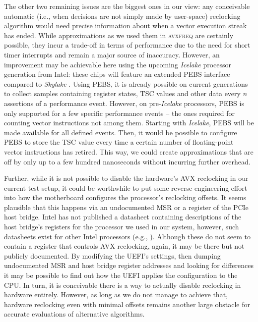 The other two remaining issues are the biggest ones in our view: any conceivable automatic (i.e., when decisions are not simply made by user-space) reclocking algorithm would need precise information about when a vector execution streak has ended. While approximations as we used them in \textsc{avxfreq} are certainly possible, they incur a trade-off in terms of performance due to the need for short timer interrupts and remain a major source of inaccuracy. However, an improvement may be achievable here using the upcoming \textit{Icelake} processor generation from Intel: these chips will feature an extended \gls{PEBS} interface compared to \textit{Skylake} \cite{intelsdmsysprogguide}. Using \gls{PEBS}, it is already possible on current generations to collect samples containing register states, \gls{TSC} values and other data every $n$ assertions of a performance event. However, on pre-\textit{Icelake} processors, \gls{PEBS} is only supported for a few specific performance events -- the ones required for counting vector instructions not among them. Starting with \textit{Icelake}, \gls{PEBS} will be made available for all defined events. Then, it would be possible to configure \gls{PEBS} to store the \gls{TSC} value every time a certain number of floating-point vector instructions has retired. This way, we could create approximations that are off by only up to a few hundred nanoseconds without incurring further overhead. 

Further, while it is not possible to disable the hardware's \gls{AVX} reclocking in our current test setup, it could be worthwhile to put some reverse engineering effort into how the motherboard configures the processor's reclocking offsets. It seems plausible that this happens via an undocumented \gls{MSR} or a register of the \gls{PCIe} host bridge. Intel has not published a datasheet containing descriptions of the host bridge's registers for the processor we used in our system, however, such datasheets exist for other Intel processors (e.g., \cite{intel7thgendatasheetvol2}). Although these do not seem to contain a register that controls \gls{AVX} reclocking, again, it may be there but not publicly documented. By modifying the \gls{UEFI}'s settings, then dumping undocumented \gls{MSR} and host bridge register addresses and looking for differences it may be possible to find out how the \gls{UEFI} applies the configuration to the \gls{CPU}. In turn, it is conceivable there is a way to actually disable reclocking in hardware entirely. However, as long as we do not manage to achieve that, hardware reclocking even with minimal offsets remains another large obstacle for accurate evaluations of alternative algorithms.

